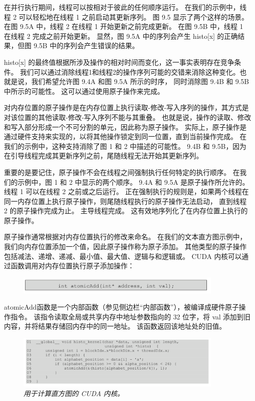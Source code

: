 在并行执行期间，线程可以按相对于彼此的任何顺序运行。 在我们的示例中，线程 2 可以轻松地在线程 1 之前启动其更新序列。
图 9.5 显示了两个这样的场景。 在图 9.5A 中，线程 2 在线程 1 开始更新之前完成更新。 
在图 9.5B 中，线程 1 在线程 2 完成之前开始更新。 
显然，图 9.5A 中的序列会产生 histo[x] 的正确结果，但图 9.5B 中的序列会产生错误的结果。

histo[x] 的最终值根据所涉及操作的相对时间而变化，这一事实表明存在竞争条件。 
我们可以通过消除线程1和线程2的操作序列可能的交错来消除这种变化。也就是说，我们希望允许图 9.4A 和图 9.5A 所示的时序， 
同时消除图 9.4B 和 9.5B 中所示的可能性。 这可以通过使用原子操作来完成。

对内存位置的原子操作是在内存位置上执行读取-修改-写入序列的操作，其方式是对该位置的其他读取-修改-写入序列不能与其重叠。 
也就是说，操作的读取、修改和写入部分形成一个不可分割的单元，因此称为原子操作。 
实际上，原子操作是通过硬件支持来实现的，以将其他操作锁定到同一位置，直到当前操作完成。 
在我们的示例中，这种支持消除了图 1 和 2 中描述的可能性。 
9.4B 和 9.5B，因为在引导线程完成其更新序列之前，尾随线程无法开始其更新序列。

重要的是要记住，原子操作不会在线程之间强制执行任何特定的执行顺序。 在我们的示例中，图 1 和 2 中显示的两个顺序。 
9.4A 和 9.5A 是原子操作所允许的。 线程 1 可以在线程 2 之前或之后运行。
正在强制执行的规则是，如果两个线程在同一内存位置上执行原子操作，则尾随线程执行的原子操作无法启动，
直到线程 2 的原子操作完成为止。 主导线程完成。 这有效地序列化了在内存位置上执行的原子操作。

原子操作通常根据对内存位置执行的修改来命名。 在我们的文本直方图示例中，我们向内存位置添加一个值，因此原子操作称为原子添加。 
其他类型的原子操作包括减法、递增、递减、最小值、最大值、逻辑与和逻辑或。 
CUDA 内核可以通过函数调用对内存位置执行原子添加操作：

\begin{figure}[H]
	\centering
	\includegraphics[width=0.9\textwidth]{figs/F9-a1.png}
\end{figure}

atomicAdd函数是一个内部函数（参见侧边栏“内部函数”），被编译成硬件原子操作指令。 
该指令读取全局或共享内存中地址参数指向的 32 位字，将 val 添加到旧内容，并将结果存储回内存中的同一地址。 
该函数返回该地址处的旧值。

\begin{figure}[H]
	\centering
	\includegraphics[width=0.9\textwidth]{figs/F9.6.png}
	\caption{\textit{用于计算直方图的 CUDA 内核。}}
\end{figure}

